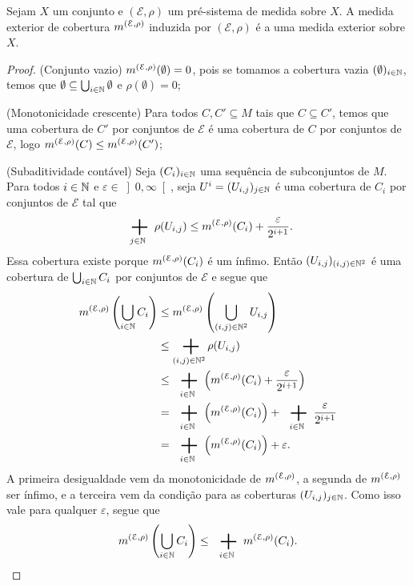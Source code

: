 \begin{proposition}
Sejam $X$ um conjunto e $(\mathcal E, \rho)$ um pré-sistema de medida sobre $X$. A medida exterior de cobertura $m^{(\mathcal E, \rho)}$ induzida por $(\mathcal E, \rho)$ é a uma medida exterior sobre $X$.
\end{proposition}
\begin{proof}
(Conjunto vazio) $m^{(\mathcal E, \rho)}(\emptyset)=0$, pois se tomamos a cobertura vazia $(\emptyset)_{i \in \mathbb{N}}$, temos que $\emptyset \subseteq \bigcup_{i \in \mathbb{N}} \emptyset$ e $\rho(\emptyset)=0$;

(Monotonicidade crescente) Para todos $C,C' \subseteq M$ tais que $C \subseteq C'$, temos que uma cobertura de $C'$ por conjuntos de $\mathcal E$ é uma cobertura de $C$ por conjuntos de $\mathcal E$, logo $m^{(\mathcal E, \rho)}(C) \leq m^{(\mathcal E, \rho)}(C')$;

(Subaditividade contável) Seja $(C_i)_{i \in \mathbb{N}}$ uma sequência de subconjuntos de $M$. Para todos $i \in \mathbb{N}$ e $\varepsilon \in \left]0,\infty\right[$, seja $U^i=(U_{i,j})_{j \in \mathbb{N}}$ é uma cobertura de $C_i$ por conjuntos de $\mathcal E$ tal que
	\begin{equation*}
	\sum_{j \in \N} \rho(U_{i,j}) \leq \med^{(\mathcal E, \rho)}(C_i) + \frac{\varepsilon}{2^{i+1}}.
	\end{equation*}
Essa cobertura existe porque $m^{(\mathcal E, \rho)}(C_i)$ é um ínfimo. Então $(U_{i,j})_{(i,j) \in \mathbb{N}^2}$ é uma cobertura de $\bigcup_{i \in \mathbb{N}} C_i$ por conjuntos de $\mathcal E$ e segue que
	\begin{align*}
	\med^{(\mathcal E, \rho)}\left( \bigcup_{i \in \N} C_i \right) &\leq \med^{(\mathcal E, \rho)}\left( \bigcup_{(i,j) \in \N^2} U_{i,j} \right) \\
		&\leq \sum_{(i,j) \in \N^2} \rho(U_{i,j}) \\
		&\leq \sum_{i \in \N} \left( \med^{(\mathcal E, \rho)}(C_i) + \frac{\varepsilon}{2^{i+1}} \right) \\
		&= \sum_{i \in \N} \left( \med^{(\mathcal E, \rho)}(C_i)\right) + \sum_{i \in \N}\frac{\varepsilon}{2^{i+1}} \\
		&= \sum_{i \in \N} \left( \med^{(\mathcal E, \rho)}(C_i)\right) + \varepsilon.
	\end{align*}
A primeira desigualdade vem da monotonicidade de $m^{(\mathcal E, \rho)}$, a segunda de $m^{(\mathcal E, \rho)}$ ser ínfimo, e a terceira vem da condição para as coberturas $(U_{i,j})_{j \in \mathbb{N}}$. Como isso vale para qualquer $\varepsilon$, segue que
	\begin{equation*}
	\med^{(\mathcal E, \rho)}\left( \bigcup_{i \in \N} C_i \right) \leq \sum_{i \in \N} \med^{(\mathcal E, \rho)}(C_i). \qedhere
	\end{equation*}
\end{proof}

